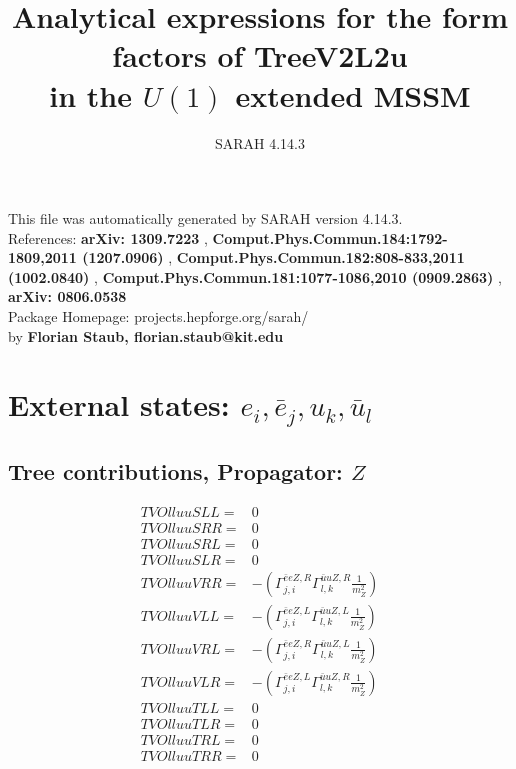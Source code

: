 \documentclass[A4,landscape]{article}
\begin{document}
\title{Analytical expressions for the form factors of TreeV2L2u\\ in the $U(1)$ extended MSSM } 
 \author{SARAH 4.14.3} 
 \maketitle 
 \vspace{10cm} 
This file was automatically generated by SARAH version 4.14.3.  \\ 
References: {\bf arXiv: 1309.7223 }, {\bf Comput.Phys.Commun.184:1792-1809,2011 (1207.0906) }, {\bf Comput.Phys.Commun.182:808-833,2011 (1002.0840) }, {\bf Comput.Phys.Commun.181:1077-1086,2010 (0909.2863) }, {\bf arXiv: 0806.0538 } \\ 
Package Homepage: projects.hepforge.org/sarah/ \\ 
by {\bf Florian Staub, florian.staub@kit.edu} 
 \pagebreak 
 \tableofcontents 
 \pagebreak 
\section{External states: ${e_{{i}}, \bar{e}_{{j}}, u_{{k}}, \bar{u}_{{l}}}$} 
\subsection{Tree contributions, Propagator: $Z$} 

\begin{align} 
  TVOlluuSLL= & 0 \\ 
  TVOlluuSRR= & 0 \\ 
  TVOlluuSRL= & 0 \\ 
  TVOlluuSLR= & 0 \\ 
  TVOlluuVRR= & -(\Gamma^{\bar{e}e Z ,R}_{j, i} \Gamma^{\bar{u}u Z ,R}_{l, k} \frac{1}{m^2_{Z}}) \\ 
  TVOlluuVLL= & -(\Gamma^{\bar{e}e Z ,L}_{j, i} \Gamma^{\bar{u}u Z ,L}_{l, k} \frac{1}{m^2_{Z}}) \\ 
  TVOlluuVRL= & -(\Gamma^{\bar{e}e Z ,R}_{j, i} \Gamma^{\bar{u}u Z ,L}_{l, k} \frac{1}{m^2_{Z}}) \\ 
  TVOlluuVLR= & -(\Gamma^{\bar{e}e Z ,L}_{j, i} \Gamma^{\bar{u}u Z ,R}_{l, k} \frac{1}{m^2_{Z}}) \\ 
  TVOlluuTLL= & 0 \\ 
  TVOlluuTLR= & 0 \\ 
  TVOlluuTRL= & 0 \\ 
  TVOlluuTRR= & 0 \\ 
\end{align} 
\end{document}
